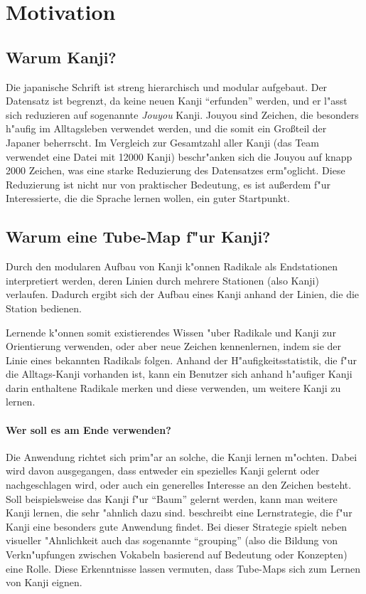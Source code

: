 \section{Motivation}
\subsection{Warum Kanji?}
Die japanische Schrift ist streng hierarchisch und modular aufgebaut. Der Datensatz ist begrenzt, da keine neuen Kanji "`erfunden"' werden, und er l"asst sich reduzieren auf sogenannte \emph{Jouyou} Kanji. Jouyou sind Zeichen, die besonders h"aufig im Alltagsleben verwendet werden, und die somit ein Gro\ss teil der Japaner beherrscht. Im Vergleich zur Gesamtzahl aller Kanji (das Team verwendet eine Datei mit 12000 Kanji) beschr"anken sich die Jouyou auf knapp 2000 Zeichen, was eine starke Reduzierung des Datensatzes erm"oglicht.
Diese Reduzierung ist nicht nur von praktischer Bedeutung, es ist au\ss erdem f"ur Interessierte, die die Sprache lernen wollen, ein guter Startpunkt. 

\subsection{Warum eine Tube-Map f"ur Kanji?}
Durch den modularen Aufbau von Kanji k"onnen Radikale als Endstationen interpretiert werden, deren Linien durch mehrere Stationen (also Kanji) verlaufen. Dadurch ergibt sich der Aufbau eines Kanji anhand der Linien, die die Station bedienen. 

Lernende k"onnen somit existierendes Wissen "uber Radikale und Kanji zur Orientierung verwenden, oder aber neue Zeichen kennenlernen, indem sie der Linie eines bekannten Radikals folgen. Anhand der H"aufigkeitsstatistik, die f"ur die Alltags-Kanji vorhanden ist, kann ein Benutzer sich anhand h"aufiger Kanji darin enthaltene Radikale merken und diese verwenden, um weitere Kanji zu lernen. 
\paragraph{Wer soll es am Ende verwenden?}
Die Anwendung richtet sich prim"ar an solche, die Kanji lernen m"ochten. Dabei wird davon ausgegangen, dass entweder ein spezielles Kanji gelernt oder nachgeschlagen wird, oder auch ein generelles Interesse an den Zeichen besteht. Soll beispielsweise das Kanji f"ur "`Baum"' gelernt werden, kann man weitere Kanji lernen, die sehr "ahnlich dazu sind.  
\cite{kanjilearningjapanese10} beschreibt eine Lernstrategie, die f"ur Kanji eine besonders gute Anwendung findet. Bei dieser Strategie spielt neben visueller "Ahnlichkeit auch das sogenannte "`grouping"' (also die Bildung von Verkn"upfungen zwischen Vokabeln basierend auf Bedeutung oder Konzepten) eine Rolle. Diese Erkenntnisse lassen vermuten, dass Tube-Maps sich zum Lernen von Kanji eignen.
